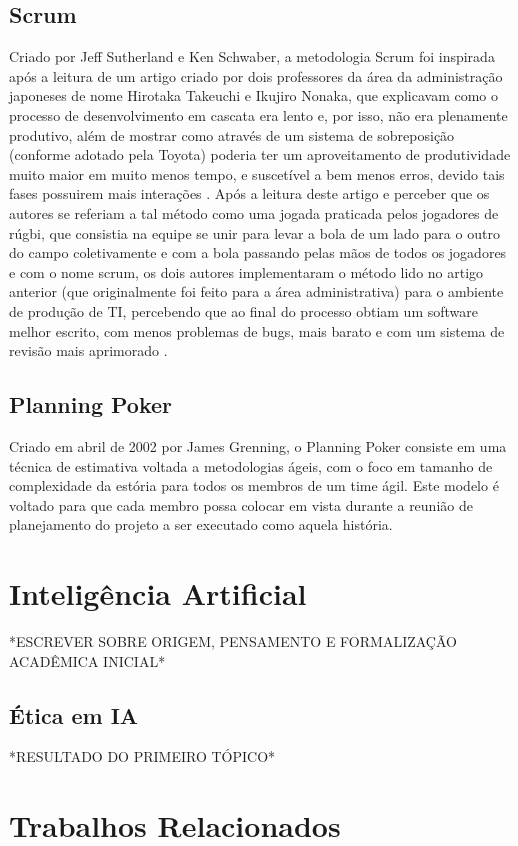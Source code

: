 \subsection{Scrum}
Criado por Jeff Sutherland e Ken Schwaber, a metodologia Scrum\cite{Scrum} foi inspirada após a leitura de um artigo criado por dois professores da área da administração japoneses de nome Hirotaka Takeuchi e Ikujiro Nonaka, que explicavam como o processo de desenvolvimento em cascata era lento e, por isso, não era plenamente produtivo, além de mostrar como através de um sistema de sobreposição (conforme adotado pela Toyota) poderia ter um aproveitamento de produtividade muito maior em muito menos tempo, e suscetível a bem menos erros, devido tais fases possuirem mais interações \cite{NewNew}. Após a leitura deste artigo e perceber que os autores se referiam a tal método como uma jogada praticada pelos jogadores de rúgbi, que consistia na equipe se unir para levar a bola de um lado para o outro do campo coletivamente e com a bola passando pelas mãos de todos os jogadores e com o nome scrum, os dois autores implementaram o método lido no artigo anterior (que originalmente foi feito para a área administrativa) para o ambiente de produção de TI, percebendo que ao final do processo obtiam um software melhor escrito, com menos problemas de bugs, mais barato e com um sistema de revisão mais aprimorado \cite{ScrumBook}.

\subsection{Planning Poker}
Criado em abril de 2002 por James Grenning, o Planning Poker consiste em uma técnica de estimativa voltada a metodologias ágeis, com o foco em tamanho de complexidade da estória para todos os membros de um time ágil. \cite{planningpoker} Este modelo é voltado para que cada membro possa colocar em vista durante a reunião de planejamento do projeto a ser executado como aquela história\cite{ScrumBook}. 

\section{Inteligência Artificial}
*ESCREVER SOBRE ORIGEM, PENSAMENTO E FORMALIZAÇÃO ACADÊMICA INICIAL*

\subsection{Ética em IA}
*RESULTADO DO PRIMEIRO TÓPICO*

\section{Trabalhos Relacionados}
